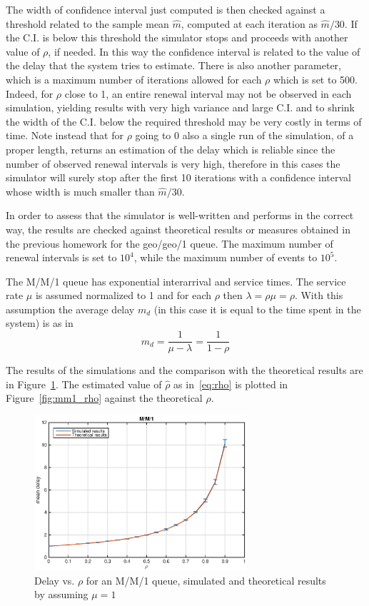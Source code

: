 \documentclass[10pt]{article}
\begin{document}
The width of confidence interval just computed is then checked against a threshold related to the sample mean $\hat{m}$, computed at each iteration as $\hat{m}/30$. If the C.I. is below this threshold the simulator stops and proceeds with another value of $\rho$, if needed. In this way the confidence interval is related to the value of the delay that the system tries to estimate. There is also another parameter, which is a maximum number of iterations allowed for each $\rho$ which is set to 500. Indeed, for $\rho$ close to 1, an entire renewal interval may not be observed in each simulation, yielding results with very high variance and large C.I. and to shrink the width of the C.I. below the required threshold may be very costly in terms of time. Note instead that for $\rho$ going to 0 also a single run of the simulation, of a proper length, returns an estimation of the delay which is reliable since the number of observed renewal intervals is very high, therefore in this cases the simulator will surely stop after the first 10 iterations with a confidence interval whose width is much smaller than $\hat{m}/30$. 

In order to assess that the simulator is well-written and performs in the correct way, the results are checked against theoretical results or measures obtained in the previous homework for the geo/geo/1 queue. The maximum number of renewal intervals is set to $10^4$, while the maximum number of events to $10^5$.

The M/M/1 queue has exponential interarrival and service times. The service rate $\mu$ is assumed normalized to 1 and for each $\rho$ then $\lambda = \rho \mu = \rho$. With this assumption the average delay $m_d$ (in this case it is equal to the time spent in the system) is as in~\cite{bz}
\begin{equation}
	m_d = \frac{1}{\mu - \lambda} = \frac{1}{1-\rho}
\end{equation}

The results of the simulations and the comparison with the theoretical results are in Figure~\ref{fig:mm1_dl}. The estimated value of $\hat{\rho}$ as in~\eqref{eq:rho} is plotted in Figure~\ref{fig:mm1_rho} against the theoretical $\rho$. 

\begin{figure}[h!]
	\centering
	\includegraphics[width = 0.7\textwidth]{mm1_dl}
	\caption{Delay vs. $\rho$ for an M/M/1 queue, simulated and theoretical results by assuming $\mu = 1$}
	\label{fig:mm1_dl}
\end{figure}
\end{document}
